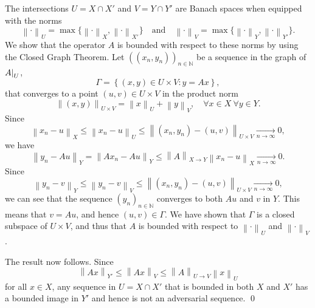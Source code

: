 \documentclass{article}
\theoremstyle{definition}
\newcommand{\N}{\mathbb{N}}
\newcommand{\norm}[1]{\left\lVert#1\right\rVert}
\newcommand{\restrict}[2]{{\left.\kern-\nulldelimiterspace #1\right|_{#2}}}
\begin{document}
    The intersections \(U = X\cap X'\) and \(V = Y\cap Y'\) are Banach spaces when equipped with the norms
    \begin{equation*}
      \norm{\cdot}_{U}= \max\{ \norm{\cdot}_X,\norm{\cdot}_{X'}\} 
      \quad\text{and}\quad
      \norm{\cdot}_{V}= \max\{ \norm{\cdot}_Y,\norm{\cdot}_{Y'}\}.
    \end{equation*}
    We show that the operator \(A\) is bounded with respect to these norms by using the Closed Graph Theorem.
    Let \(((x_n,y_n))_{n\in\N}\) be a sequence in the graph of \(\restrict{A}{U}\),
    \begin{equation*}
        \Gamma = \left\{(x,y)\in U\times V\colon y=Ax\right\},
    \end{equation*}
    that converges to a point \((u,v)\in U\times V\) in the product norm
    \begin{equation*}
        \norm{(x,y)}_{U\times V}
        = \norm{x}_U + \norm{y}_V,
        \quad
        \forall x\in X\ \forall y\in Y.
    \end{equation*}
    Since
    \begin{equation*}
        \norm{x_n - u}_X
        \leq
        \norm{x_n - u}_U
        \leq\norm{(x_n,y_n) - (u,v)}_{U\times V}
        \xrightarrow[n \to \infty]{} 0,
    \end{equation*}
    we have
    \begin{equation*}
        \norm{y_n - Au}_Y =\norm{Ax_n-Au}_Y \leq \norm{A}_{X\to Y} \norm{x_n - u}_X \xrightarrow[n \to \infty]{} 0.
    \end{equation*}
    Since
    \begin{equation*}
        \norm{y_n - v}_Y \leq \norm{y_n-v}_V \leq \norm{(x_n,y_n) - (u,v)}_{U\times V}
        \xrightarrow[n \to \infty]{} 0,
    \end{equation*}
    we can see that
    the sequence \((y_n)_{n\in\N}\) converges to both \(Au\) and \(v\) in \(Y\).
    This means that \(v=Au\), and hence \((u,v)\in\Gamma\).
    We have shown that \(\Gamma\) is a closed subspace of \(U\times V\),
    and thus that \(A\) is bounded with respect to \(\norm{\cdot}_U\) and \(\norm{\cdot}_V\).
    
    The result now follows.
    Since
    \begin{equation*}
        \norm{Ax}_{Y'} \leq \norm{Ax}_V
        \leq \norm{A}_{U\to V} \norm{x}_U
    \end{equation*}
    for all \(x\in X\),
    any sequence in \(U=X\cap X'\) that is bounded in both \(X\) and \(X'\) has a bounded image in \(Y'\) and hence is  not an adversarial sequence.
\qed\bigskip
\end{document}
